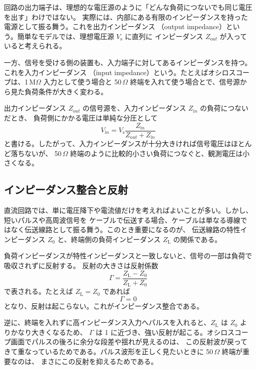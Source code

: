 \documentclass[uplatex,dvipdfmx,12pt,nomag]{jsarticle}
\begin{document}
回路の出力端子は、理想的な電圧源のように「どんな負荷につないでも同じ電圧を出す」わけではない。
実際には、内部にある有限のインピーダンスを持った電源として振る舞う。これを出力インピーダンス
（output impedance）という。簡単なモデルでは、理想電圧源 $V_{\mathrm s}$ に直列に
インピーダンス $Z_{\mathrm out}$ が入っていると考えられる。

一方、信号を受ける側の装置も、入力端子に対してあるインピーダンスを持つ。これを入力インピーダンス
（input impedance）という。たとえばオシロスコープは、1\,M$\Omega$ 入力として使う場合と
50\,$\Omega$ 終端を入れて使う場合とで、信号源から見た負荷条件が大きく変わる。

出力インピーダンス $Z_{\mathrm out}$ の信号源を、入力インピーダンス $Z_{\mathrm in}$ の負荷につないだとき、
負荷側にかかる電圧は単純な分圧として
\begin{equation}
  V_{\mathrm in}
  =
  V_{\mathrm s}
  \frac{Z_{\mathrm in}}{Z_{\mathrm out}+Z_{\mathrm in}}
\end{equation}
と書ける。したがって、入力インピーダンスが十分大きければ信号電圧はほとんど落ちないが、
50\,$\Omega$ 終端のように比較的小さい負荷につなぐと、観測電圧は小さくなる。

\subsection{インピーダンス整合と反射}

直流回路では、単に電圧降下や電流値だけを考えればよいことが多い。しかし、短いパルスや高周波信号を
ケーブルで伝送する場合、ケーブルは単なる導線ではなく伝送線路として振る舞う。このとき重要になるのが、
伝送線路の特性インピーダンス $Z_0$ と、終端側の負荷インピーダンス $Z_{\mathrm L}$ の関係である。

負荷インピーダンスが特性インピーダンスと一致しないと、信号の一部は負荷で吸収されずに反射する。
反射の大きさは反射係数
\begin{equation}
  \Gamma
  =
  \frac{Z_{\mathrm L}-Z_0}{Z_{\mathrm L}+Z_0}
\end{equation}
で表される。たとえば $Z_{\mathrm L}=Z_0$ であれば
\begin{equation}
  \Gamma = 0
\end{equation}
となり、反射は起こらない。これがインピーダンス整合である。

逆に、終端を入れずに高インピーダンス入力へパルスを入れると、$Z_{\mathrm L}$ は $Z_0$ よりかなり大きくなるため、
$\Gamma$ は 1 に近づき、強い反射が起こる。オシロスコープ画面でパルスの後ろに余分な段差や揺れが見えるのは、
この反射波が戻ってきて重なっているためである。パルス波形を正しく見たいときに 50\,$\Omega$ 終端が重要なのは、
まさにこの反射を抑えるためである。
\end{document}
